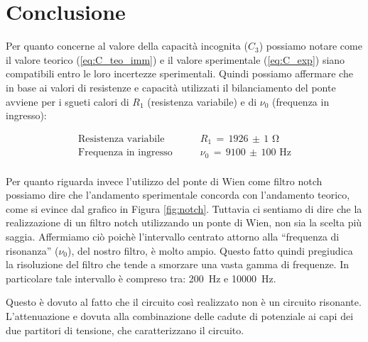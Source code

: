 \section*{Conclusione}

Per quanto concerne al valore della capacità incognita ($C_3$) possiamo notare come il valore teorico (\ref{eq:C_teo_imm}) e il valore sperimentale (\ref{eq:C_exp}) siano compatibili entro le loro incertezze sperimentali. Quindi possiamo affermare che in base ai valori di resistenze e capacità utilizzati il bilanciamento del ponte avviene per i sgueti calori di $R_1$ (resistenza variabile) e di $\nu_0$ (frequenza in ingresso):

\begin{align*}
	\text{Resistenza variabile}& \qquad R_1 \,=\, 1926 \,\pm\, 1 \,\,\si{\ohm} \\
	\text{Frequenza in ingresso}& \qquad \nu_0 \,=\, 9100 \,\pm\, 100 \,\,\si{\hertz} \\
\end{align*}

Per quanto riguarda invece l'utilizzo del ponte di Wien come filtro notch possiamo dire che l'andamento sperimentale concorda con l'andamento teorico, come si evince dal grafico in Figura \ref{fig:notch}. Tuttavia ci sentiamo di dire che la realizzazione di un filtro notch utilizzando un ponte di Wien, non sia la scelta più saggia. Affermiamo ciò poichè l'intervallo centrato attorno alla ``frequenza di risonanza'' ($\nu_0$), del nostro filtro, è molto ampio. Questo fatto quindi pregiudica la risoluzione del filtro che tende a smorzare una vasta gamma di frequenze. In particolare tale intervallo è compreso tra: \SI{200}{\hertz} e \SI{10000}{\hertz}.

Questo è dovuto al fatto che il circuito così realizzato non è un circuito risonante. L'attenuazione e dovuta alla combinazione delle cadute di potenziale ai capi dei due partitori di tensione, che caratterizzano il circuito.

